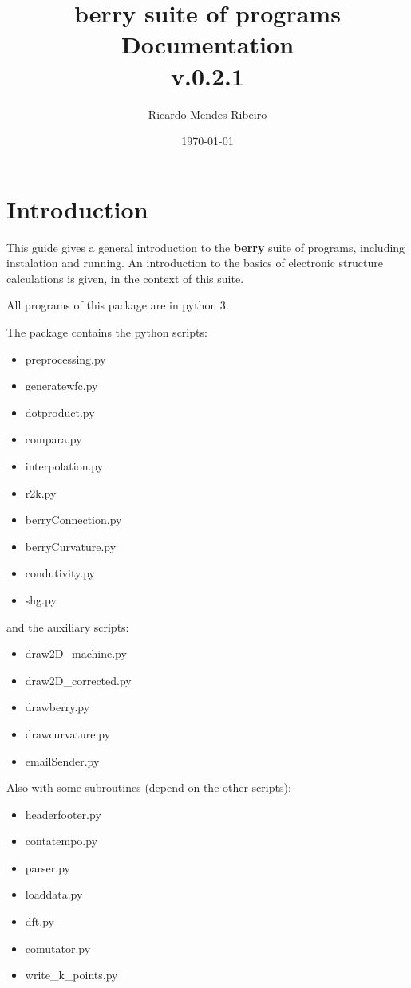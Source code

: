 \documentclass[a4paper,12pt]{report}
\title{{\bf berry} suite of programs\\
\large Documentation \\
v.0.2.1}
\author{Ricardo Mendes Ribeiro}
\date{\today}
\begin{document}
\maketitle
\tableofcontents

\chapter{Introduction}\label{ch:introduction}

 This guide gives a general introduction to the \textbf{berry} suite of programs, including instalation and running.
 An introduction to the basics of electronic structure calculations is given, in the context of this suite.

 All programs of this package are in python 3.

The package contains the python scripts:
\begin{itemize}
 \item preprocessing.py
 \item generatewfc.py
 \item dotproduct.py
 \item compara.py
 \item interpolation.py
 \item r2k.py
 \item berryConnection.py
 \item berryCurvature.py
 \item condutivity.py
 \item shg.py
\end{itemize}\medskip

and the auxiliary scripts:
\begin{itemize}
 \item draw2D\_machine.py
 \item draw2D\_corrected.py
 \item drawberry.py
 \item drawcurvature.py
 \item emailSender.py
\end{itemize}\medskip

Also with some subroutines (depend on the other scripts):
\begin{itemize}
 \item headerfooter.py
 \item contatempo.py
 \item parser.py
 \item loaddata.py
 \item dft.py
 \item comutator.py
 \item write\_k\_points.py
\end{itemize}
\end{document}

